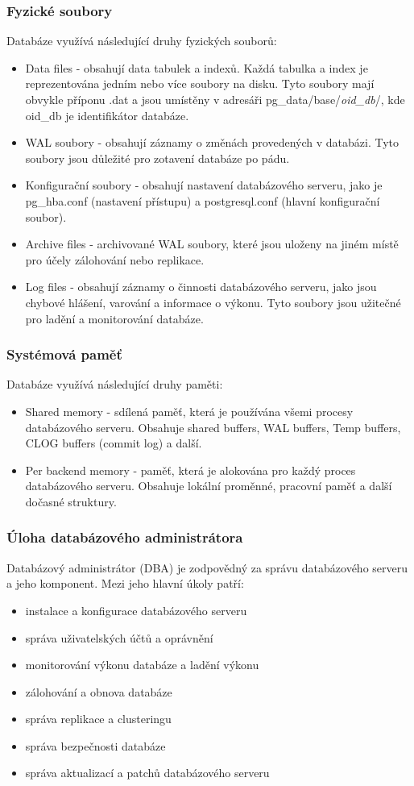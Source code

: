 \subsubsection*{Fyzické soubory}
Databáze využívá následující druhy fyzických souborů:
\begin{itemize}
    \item Data files - obsahují data tabulek a indexů. Každá tabulka a index je reprezentována jedním nebo více soubory na disku. Tyto soubory mají obvykle příponu .dat a jsou umístěny v adresáři pg\_data/base/\textit{oid\_db}/, kde oid\_db je identifikátor databáze.
  \item WAL soubory - obsahují záznamy o změnách provedených v databázi. Tyto soubory jsou důležité pro zotavení databáze po pádu.
  \item Konfigurační soubory - obsahují nastavení databázového serveru, jako je pg\_hba.conf (nastavení přístupu) a postgresql.conf (hlavní konfigurační soubor).
  \item Archive files - archivované WAL soubory, které jsou uloženy na jiném místě pro účely zálohování nebo replikace.
    \item Log files - obsahují záznamy o činnosti databázového serveru, jako jsou chybové hlášení, varování a informace o výkonu. Tyto soubory jsou užitečné pro ladění a monitorování databáze.
\end{itemize}

\subsubsection*{Systémová paměť}
Databáze využívá následující druhy paměti:
\begin{itemize}
    \item Shared memory - sdílená paměť, která je používána všemi procesy databázového serveru. Obsahuje shared buffers, WAL buffers, Temp buffers, CLOG buffers (commit log) a další.
    \item Per backend memory - paměť, která je alokována pro každý proces databázového serveru. Obsahuje lokální proměnné, pracovní paměť a další dočasné struktury.
\end{itemize}

\subsubsection*{Úloha databázového administrátora}
Databázový administrátor (DBA) je zodpovědný za správu databázového serveru a jeho komponent. Mezi jeho hlavní úkoly patří:
\begin{itemize}
    \item instalace a konfigurace databázového serveru
    \item správa uživatelských účtů a oprávnění
    \item monitorování výkonu databáze a ladění výkonu
    \item zálohování a obnova databáze
    \item správa replikace a clusteringu
    \item správa bezpečnosti databáze
    \item správa aktualizací a patchů databázového serveru
\end{itemize}
